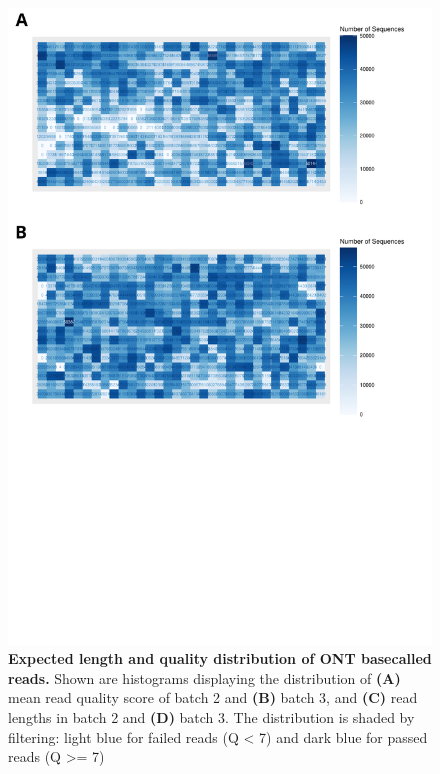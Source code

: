 \begin{figure}[]
	\begin{center}
		\includegraphics[page=3,trim={0 0cm 0cm 11cm},clip, scale = 0.45]{Figures/ONTTargetedTranscriptome.pdf}
	\end{center}
	\captionsetup{width=0.95\textwidth}
	\caption[ONT run performance metrics from targeted profiling of rTg4510 mice]%
	{\textbf{Expected length and quality distribution of ONT basecalled reads.} Shown are histograms displaying the distribution of \textbf{(A)} mean read quality score of batch 2 and \textbf{(B)} batch 3, and \textbf{(C)} read lengths in batch 2 and \textbf{(D)} batch 3. The distribution is shaded by filtering: light blue for failed reads (Q < 7) and dark blue for passed reads (Q >= 7) }
	\label{fig:ont_targetedlengthquality}
\end{figure}

